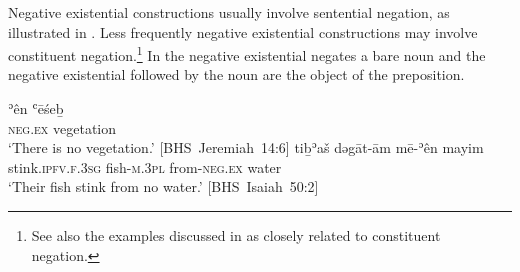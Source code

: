 \documentclass[output=paper,colorlinks,citecolor=brown,draft,draftmode]{langscibook}
\begin{document}
Negative existential constructions usually involve sentential negation, as
illustrated in . %
%
Less frequently negative existential constructions may involve constituent
negation.\footnote{See also the examples discussed in \textcite[803,
§2.5]{NaudeRendsburg2013} as closely related to constituent negation.} In
 the negative existential negates a bare noun and the negative existential followed by the noun are the object of the preposition.
%
\begin{exe}\ex\label{ex:heb-vegetation-stink}
\begin{xlist}
\ex\label{ex:heb-vegetation}
\gll ʾên  ʿēśeḇ\\
    \textsc{neg.ex} vegetation\\
\glt `There is no vegetation.' \mbox{[BHS Jeremiah
14:6]}
\ex\label{ex:heb-stink}
\gll tiḇʾaš dəgāt-ām mē-ʾên mayim\\
stink.\textsc{ipfv.f.3sg} fish-\textsc{m.3pl}  from-\textsc{neg.ex} water\\
\glt `Their fish stink from no water.' \mbox{[BHS
Isaiah 50:2]}
\end{xlist}
\end{exe}
%
\end{document}
